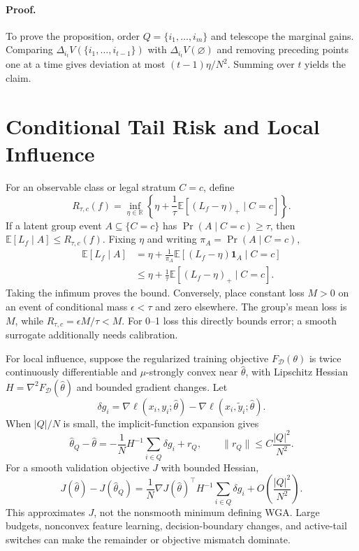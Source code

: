 \documentclass{article}
\begin{document}
\paragraph{Proof.}
To prove the proposition, order $Q=\{i_1,\ldots,i_m\}$ and telescope the marginal gains. Comparing $\Delta_{i_t}V(\{i_1,\ldots,i_{t-1}\})$ with $\Delta_{i_t}V(\varnothing)$ and removing preceding points one at a time gives deviation at most $(t-1)\eta/N^2$. Summing over $t$ yields the claim.

\section{Conditional Tail Risk and Local Influence}
\label{app:cvar}

For an observable class or legal stratum $C=c$, define
\begin{equation}
R_{\tau,c}(f)=\inf_{\eta\in\mathbb R}\left\{\eta+\frac{1}{\tau}
\mathbb E[(L_f-\eta)_+\mid C=c]\right\}.
\end{equation}
If a latent group event $A\subseteq\{C=c\}$ has $\Pr(A\mid C=c)\geq\tau$, then $\mathbb E[L_f\mid A]\leq R_{\tau,c}(f)$. Fixing $\eta$ and writing $\pi_A=\Pr(A\mid C=c)$,
\begin{align}
\mathbb E[L_f\mid A]
&=\eta+\frac{1}{\pi_A}\mathbb E[(L_f-\eta)\mathbf1_A\mid C=c]\\
&\leq\eta+\frac{1}{\tau}\mathbb E[(L_f-\eta)_+\mid C=c].
\end{align}
Taking the infimum proves the bound. Conversely, place constant loss $M>0$ on an event of conditional mass $\epsilon<\tau$ and zero elsewhere. The group's mean loss is $M$, while $R_{\tau,c}=\epsilon M/\tau<M$. For 0--1 loss this directly bounds error; a smooth surrogate additionally needs calibration.

For local influence, suppose the regularized training objective $F_{\mathcal D}(\theta)$ is twice continuously differentiable and $\mu$-strongly convex near $\hat\theta$, with Lipschitz Hessian $H=\nabla^2F_{\mathcal D}(\hat\theta)$ and bounded gradient changes. Let
\begin{equation}
 \delta g_i=\nabla\ell(x_i,y_i;\hat\theta)-\nabla\ell(x_i,\tilde y_i;\hat\theta).
\end{equation}
When $|Q|/N$ is small, the implicit-function expansion gives
\begin{equation}
 \hat\theta_Q-\hat\theta=-\frac{1}{N}H^{-1}\sum_{i\in Q}\delta g_i+r_Q,
 \qquad \|r_Q\|\leq C\frac{|Q|^2}{N^2}.
\end{equation}
For a smooth validation objective $J$ with bounded Hessian,
\begin{equation}
 J(\hat\theta)-J(\hat\theta_Q)=\frac{1}{N}\nabla J(\hat\theta)^\top H^{-1}
 \sum_{i\in Q}\delta g_i+O\!\left(\frac{|Q|^2}{N^2}\right).
\end{equation}
This approximates $J$, not the nonsmooth minimum defining WGA. Large budgets, nonconvex feature learning, decision-boundary changes, and active-tail switches can make the remainder or objective mismatch dominate.
\end{document}

